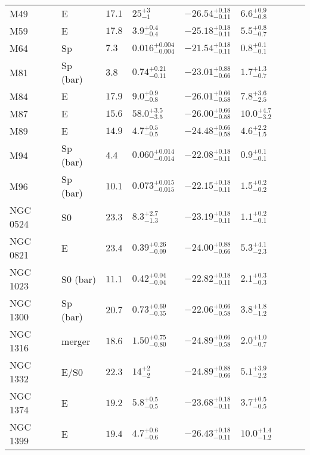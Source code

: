 \begin{table*}
\begin{center}
\begin{tabular}{llllllrll}
M49  &  E  &  $17.1$  &  $25_{-1}^{+3}$   &  $-26.54_{-0.11}^{+0.18}$   &  $6.6_{-0.8}^{+0.9}$   &   \\ 
M59  &  E  &  $17.8$  &  $3.9_{-0.4}^{+0.4}$   &  $-25.18_{-0.11}^{+0.18}$   &  $5.5_{-0.7}^{+0.8}$   &   \\ 
M64  &  Sp  &  $7.3$  &  $0.016_{-0.004}^{+0.004}$   &  $-21.54_{-0.11}^{+0.18}$   &  $0.8_{-0.1}^{+0.1}$   &   \\ 
M81  &  Sp (bar)  &  $3.8$  &  $0.74_{-0.11}^{+0.21}$   &  $-23.01_{-0.66}^{+0.88}$   &  $1.7_{-0.7}^{+1.3}$   &   \\ 
M84  &  E  &  $17.9$  &  $9.0_{-0.8}^{+0.9}$   &  $-26.01_{-0.58}^{+0.66}$   &  $7.8_{-2.5}^{+3.6}$   &   \\ 
M87  &  E  &  $15.6$  &  $58.0_{-3.5}^{+3.5}$   &  $-26.00_{-0.58}^{+0.66}$   &  $10.0_{-3.2}^{+4.7}$   &   \\ 
M89  &  E  &  $14.9$  &  $4.7_{-0.5}^{+0.5}$   &  $-24.48_{-0.58}^{+0.66}$   &  $4.6_{-1.5}^{+2.2}$   &   \\ 
M94  &  Sp (bar)  &  $4.4$  &  $0.060_{-0.014}^{+0.014}$   &  $-22.08_{-0.11}^{+0.18}$   &  $0.9_{-0.1}^{+0.1}$   &   \\ 
M96  &  Sp (bar)  &  $10.1$  &  $0.073_{-0.015}^{+0.015}$   &  $-22.15_{-0.11}^{+0.18}$   &  $1.5_{-0.2}^{+0.2}$   &   \\ 
NGC 0524  &  S0  &  $23.3$  &  $8.3_{-1.3}^{+2.7}$   &  $-23.19_{-0.11}^{+0.18}$   &  $1.1_{-0.1}^{+0.2}$   &   \\ 
NGC 0821  &  E  &  $23.4$  &  $0.39_{-0.09}^{+0.26}$   &  $-24.00_{-0.66}^{+0.88}$   &  $5.3_{-2.3}^{+4.1}$   &   \\ 
NGC 1023  &  S0 (bar)  &  $11.1$  &  $0.42_{-0.04}^{+0.04}$   &  $-22.82_{-0.11}^{+0.18}$   &  $2.1_{-0.3}^{+0.3}$   &   \\ 
NGC 1300  &  Sp (bar)  &  $20.7$  &  $0.73_{-0.35}^{+0.69}$   &  $-22.06_{-0.58}^{+0.66}$   &  $3.8_{-1.2}^{+1.8}$   &   \\ 
NGC 1316  &  merger  &  $18.6$  &  $1.50_{-0.80}^{+0.75}$   &  $-24.89_{-0.58}^{+0.66}$   &  $2.0_{-0.7}^{+1.0}$   &   \\ 
NGC 1332  &  E/S0  &  $22.3$  &  $14_{-2}^{+2}$   &  $-24.89_{-0.66}^{+0.88}$   &  $5.1_{-2.2}^{+3.9}$   &   \\ 
NGC 1374  &  E  &  $19.2$  &  $5.8_{-0.5}^{+0.5}$   &  $-23.68_{-0.11}^{+0.18}$   &  $3.7_{-0.5}^{+0.5}$   &   \\ 
NGC 1399  &  E  &  $19.4$  &  $4.7_{-0.6}^{+0.6}$   &  $-26.43_{-0.11}^{+0.18}$   &  $10.0_{-1.2}^{+1.4}$   &   \\ 

\end{tabular}
\end{center}
\end{table*}
